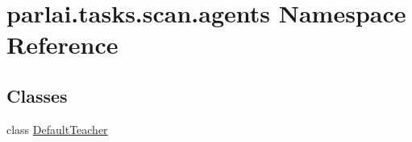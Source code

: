 \hypertarget{namespaceparlai_1_1tasks_1_1scan_1_1agents}{}\section{parlai.\+tasks.\+scan.\+agents Namespace Reference}
\label{namespaceparlai_1_1tasks_1_1scan_1_1agents}
\subsection*{Classes}
\begin{DoxyCompactItemize}
\item 
class \hyperlink{classparlai_1_1tasks_1_1scan_1_1agents_1_1DefaultTeacher}{Default\+Teacher}
\end{DoxyCompactItemize}
